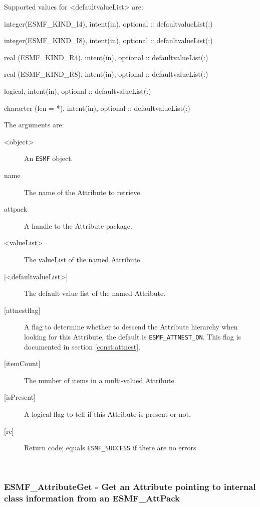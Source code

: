    Supported values for <defaultvalueList> are:
   \begin{description}
   \item integer(ESMF\_KIND\_I4), intent(in), optional :: defaultvalueList(:)
   \item integer(ESMF\_KIND\_I8), intent(in), optional :: defaultvalueList(:)
   \item real (ESMF\_KIND\_R4), intent(in), optional :: defaultvalueList(:)
   \item real (ESMF\_KIND\_R8), intent(in), optional :: defaultvalueList(:)
   \item logical, intent(in), optional :: defaultvalueList(:)
   \item character (len = *), intent(in), optional :: defaultvalueList(:)
   \end{description}
  
   The arguments are:
   \begin{description}
   \item [<object>]
   An {\tt ESMF} object.
   \item [name]
   The name of the Attribute to retrieve.
   \item [attpack]
   A handle to the Attribute package.
   \item [<valueList>]
   The valueList of the named Attribute.
   \item [{[<defaultvalueList>]}]
   The default value list of the named Attribute.
   \item [{[attnestflag]}]
   A flag to determine whether to descend the
   Attribute hierarchy when looking for this Attribute, the default
   is {\tt ESMF\_ATTNEST\_ON}. This flag is documented in section
   \ref{const:attnest}.
   \item [{[itemCount]}]
   The number of items in a multi-valued Attribute.
   \item [{[isPresent]}]
   A logical flag to tell if this Attribute is present or not.
   \item [{[rc]}]
   Return code; equals {\tt ESMF\_SUCCESS} if there are no errors.
   \end{description}
  
   
 
\mbox{}\hrulefill\ 
 
\subsubsection [ESMF\_AttributeGet] {ESMF\_AttributeGet - Get an Attribute pointing to internal class information from an ESMF\_AttPack}


